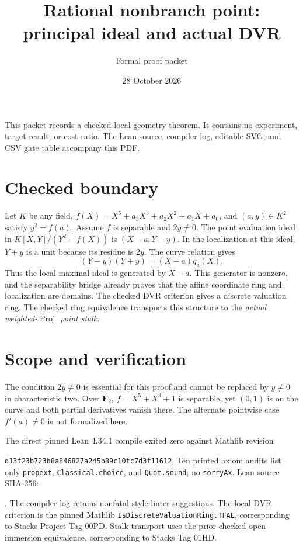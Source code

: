 \documentclass[11pt]{article}
\title{Rational nonbranch point: principal ideal and actual DVR}
\author{Formal proof packet}
\date{28 October 2026}
\begin{document}
\maketitle
\noindent This packet records a checked local geometry theorem. It contains no experiment, target result, or cost ratio. The Lean source, compiler log, editable SVG, and CSV gate table accompany this PDF.

\section*{Checked boundary}
Let $K$ be any field, $f(X)=X^5+a_3X^3+a_2X^2+a_1X+a_0$, and $(a,y)\in K^2$ satisfy $y^2=f(a)$. Assume $f$ is separable and $2y\ne0$. The point evaluation ideal in $K[X,Y]/(Y^2-f(X))$ is $(X-a,Y-y)$. In the localization at this ideal, $Y+y$ is a unit because its residue is $2y$. The curve relation gives
\[
  (Y-y)(Y+y)=(X-a)q_a(X).
\]
Thus the local maximal ideal is generated by $X-a$. This generator is nonzero, and the separability bridge already proves that the affine coordinate ring and localization are domains. The checked DVR criterion gives a discrete valuation ring. The checked ring equivalence transports this structure to the \emph{actual weighted-$\operatorname{Proj}$ point stalk}.

\section*{Scope and verification}
The condition $2y\ne0$ is essential for this proof and cannot be replaced by $y\ne0$ in characteristic two. Over $\mathbf F_2$, $f=X^5+X^3+1$ is separable, yet $(0,1)$ is on the curve and both partial derivatives vanish there. The alternate pointwise case $f'(a)\ne0$ is not formalized here.

The direct pinned Lean 4.34.1 compile exited zero against Mathlib revision
\par\noindent\texttt{d13f23b723b8a846827a245b89c10fc7d3f11612}.
Ten printed axiom audits list only \texttt{propext}, \texttt{Classical.choice}, and \texttt{Quot.sound}; no \texttt{sorryAx}. Lean source SHA-256:
\par{}.
The compiler log retains nonfatal style-linter suggestions. The local DVR criterion is the pinned Mathlib \texttt{IsDiscreteValuationRing.TFAE}, corresponding to Stacks Project Tag 00PD. Stalk transport uses the prior checked open-immersion equivalence, corresponding to Stacks Tag 01HD.
\end{document}
